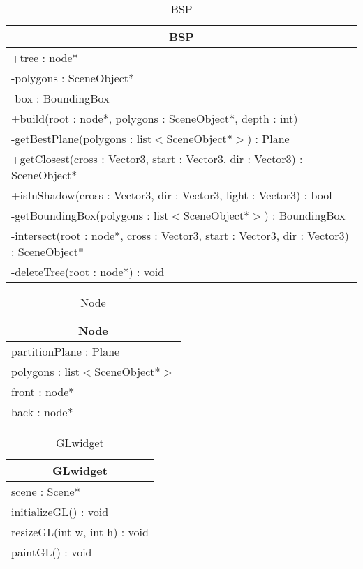 \begin{longtable}{|p{16cm}|}
	\caption{BSP} \label{tab:BSP} \\ \hline
	\multicolumn{1}{|c|}{BSP} \\ \hline
    +tree : node* \\
    -polygons : SceneObject* \\
    -box : BoundingBox \\ \hline
    +build(root : node*, polygons : SceneObject*, depth : int) \\ 
	-getBestPlane(polygons : list$<$SceneObject*$>$) : Plane \\
	+getClosest(cross : Vector3, start : Vector3, dir : Vector3) : SceneObject* \\
	+isInShadow(cross : Vector3, dir : Vector3, light : Vector3) : bool \\
	-getBoundingBox(polygons : list$<$SceneObject*$>$) : BoundingBox \\
	-intersect(root : node*, cross : Vector3, start : Vector3, dir : Vector3) : SceneObject* \\
	-deleteTree(root : node*) : void \\
    \hline
\end{longtable}

\begin{longtable}{|p{16cm}|}
    \caption{Node} \label{tab:Node} \\ \hline
    \multicolumn{1}{|c|}{Node} \\ \hline
    partitionPlane : Plane \\
    polygons : list$<$SceneObject*$>$ \\
    front : node*  \\
    back : node*  \\ \hline
\end{longtable}



\begin{longtable}{|p{16cm}|}
    \caption{GLwidget} \label{tab:GLwidget} \\ \hline
    \multicolumn{1}{|c|}{GLwidget} \\ \hline
    scene : Scene*  \\ \hline
    initializeGL() : void \\ 
    resizeGL(int w, int h) : void \\
    paintGL() : void \\ \hline
\end{longtable}

